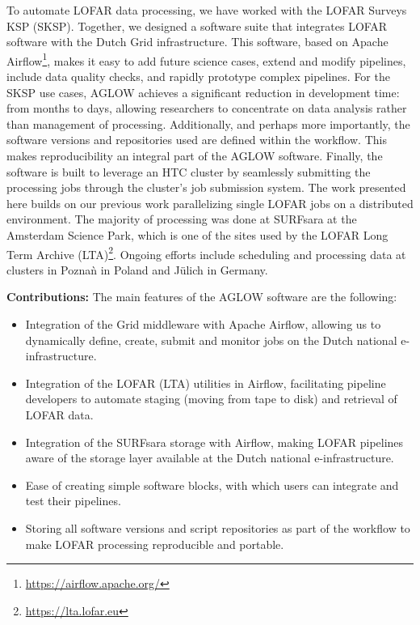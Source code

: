 To automate LOFAR data processing, we have worked with the LOFAR Surveys KSP (SKSP). Together, we designed a software suite that integrates LOFAR software\cite{cookbook} with the Dutch \Gls{Grid} infrastructure\cite{dutchinfra}. This software, based on Apache Airflow\footnote{\url{https://airflow.apache.org/}}, makes it easy to add future science cases, extend and modify pipelines, include data quality checks, and rapidly prototype complex pipelines.  For the SKSP use cases, \Gls{AGLOW} achieves a significant reduction in development time: from months to days, allowing researchers to concentrate on data analysis rather than management of processing.  Additionally, and perhaps more importantly, the software versions and repositories used are defined within the workflow. This makes reproducibility an integral part of the AGLOW software.  Finally, the software is built to  leverage an HTC cluster by seamlessly submitting the processing jobs through the cluster's job submission system\cite{glite}. The work presented here builds on our previous work parallelizing single LOFAR jobs\cite{mechev17} on a distributed environment. The majority of processing was done at SURFsara at the Amsterdam Science Park\cite{SurfSara}, which is one of the sites used by the LOFAR Long Term Archive (LTA)\footnote{\url{https://lta.lofar.eu}}. Ongoing efforts include scheduling and processing data at clusters in Pozna\`{n} in Poland and J\"{u}lich in Germany. 

\textbf{Contributions:}
The main features of the AGLOW software are the following:
\begin{itemize}
\item Integration of the Grid middleware with Apache Airflow, allowing us to dynamically define, create, submit and monitor jobs on the Dutch national e-infrastructure.
\item Integration of the LOFAR (LTA) utilities in  Airflow, facilitating pipeline developers to automate staging (moving from tape to disk) and retrieval of LOFAR data.
\item Integration of the SURFsara storage with Airflow, making LOFAR pipelines aware of the storage layer available at the Dutch national e-infrastructure.  
\item Ease of creating simple software blocks, with which users can integrate and test their pipelines. 
\item Storing all software versions and script repositories as part of the workflow to make LOFAR processing reproducible and portable. 
\end{itemize}

